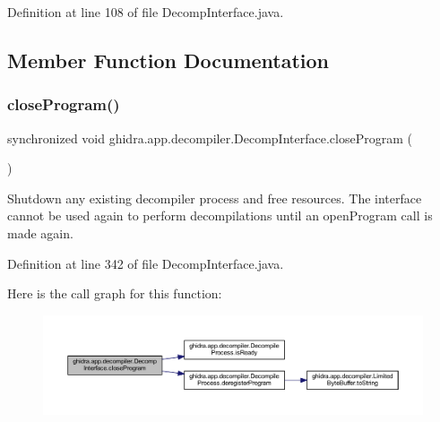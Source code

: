 Definition at line 108 of file Decomp\+Interface.\+java.



\subsection{Member Function Documentation}
\mbox{\label{classghidra_1_1app_1_1decompiler_1_1_decomp_interface_a3211ce7c55abceb8d2a9beba104ebbe6}} 
\subsubsection{\texorpdfstring{closeProgram()}{closeProgram()}}
{\footnotesize\ttfamily synchronized void ghidra.\+app.\+decompiler.\+Decomp\+Interface.\+close\+Program (\begin{DoxyParamCaption}{ }\end{DoxyParamCaption})\hspace{0.3cm}{\ttfamily [inline]}}

Shutdown any existing decompiler process and free resources. The interface cannot be used again to perform decompilations until an open\+Program call is made again. 

Definition at line 342 of file Decomp\+Interface.\+java.

Here is the call graph for this function\+:
\nopagebreak
\begin{figure}[H]
\begin{center}
\leavevmode
\includegraphics[width=350pt]{classghidra_1_1app_1_1decompiler_1_1_decomp_interface_a3211ce7c55abceb8d2a9beba104ebbe6_cgraph}
\end{center}
\end{figure}
\mbox{\label{classghidra_1_1app_1_1decompiler_1_1_decomp_interface_a634a9d0bbfd1fe75112f662aada77210}} 
